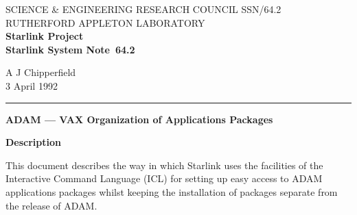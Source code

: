 \pagestyle{myheadings}

\newcommand{\stardoccategory}  {Starlink System Note}
\newcommand{\stardocinitials}  {SSN}
\newcommand{\stardocnumber}    {64.2}
\newcommand{\stardocauthors}   {A J Chipperfield}
\newcommand{\stardocdate}      {3 April 1992}
\newcommand{\stardoctitle}     {ADAM --- VAX Organization of Applications
Packages}

\newcommand{\stardocname}{\stardocinitials /\stardocnumber}
\markright{\stardocname}
\setlength{\textwidth}{160mm}
\setlength{\textheight}{230mm}
\setlength{\topmargin}{-2mm}
\setlength{\oddsidemargin}{0mm}
\setlength{\evensidemargin}{0mm}
\setlength{\parindent}{0mm}
\setlength{\parskip}{\medskipamount}
\setlength{\unitlength}{1mm}

\renewcommand{\_}{{\tt\char'137}}


\thispagestyle{empty}
SCIENCE \& ENGINEERING RESEARCH COUNCIL \hfill \stardocname\\
RUTHERFORD APPLETON LABORATORY\\
{\large\bf Starlink Project\\}
{\large\bf \stardoccategory\ \stardocnumber}
\begin{flushright}
\stardocauthors\\
\stardocdate
\end{flushright}
\vspace{-4mm}
\rule{\textwidth}{0.5mm}
\vspace{5mm}
\begin{center}
{\Large\bf \stardoctitle}
\end{center}
\vspace{20mm}
\begin{center}
{\Large\bf Description}
\end{center}
This document describes the way in which Starlink uses the facilities
of the Interactive Command Language (ICL) for setting up easy access to ADAM 
applications packages whilst keeping the installation of packages separate 
from the release of ADAM.

